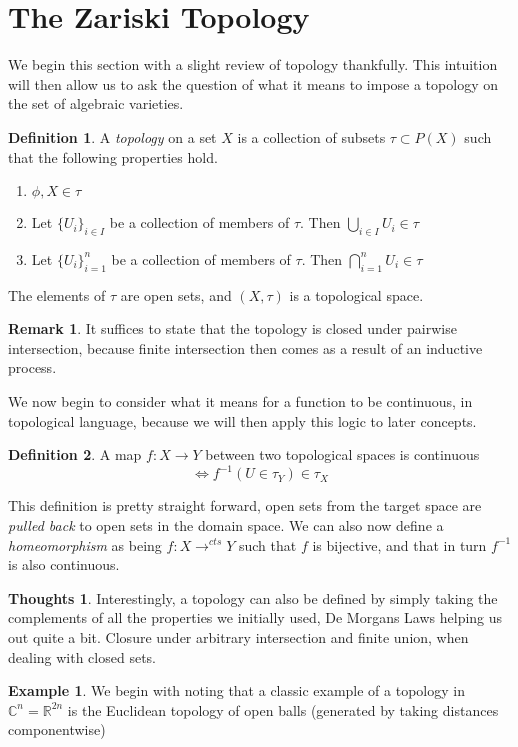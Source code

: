 \documentclass[12pt]{book}
\theoremstyle{definition}
\newtheorem*{definition}{Definition}
\newtheorem{example}{Example}[chapter]
\newtheorem*{huh}{Thoughts}
\newtheorem*{remark}{Remark}
\begin{document}
\section{The Zariski Topology}
We begin this section with a slight review of topology thankfully. This intuition will then allow us to ask the question of what it means to impose a topology on the set of algebraic varieties. 
\begin{definition}
    A \textit{topology} on a set $X$ is a collection of subsets $\tau \subset P(X)$ such that the following properties hold. \begin{enumerate}
        \item $\phi, X \in \tau$
        \item Let $\{U_i\}_{i \in I}$ be a collection of members of $\tau$. Then $\bigcup_{i \in I} U_i \in \tau$
        \item Let $\{U_i\}_{i = 1}^n$ be a collection of members of $\tau$. Then $\bigcap_{i = 1}^n U_i \in \tau$
    \end{enumerate}
    The elements of $\tau$ are open sets, and $(X, \tau)$ is a topological space.
\end{definition}
\begin{remark}
    It suffices to state that the topology is closed under pairwise intersection, because finite intersection then comes as a result of an inductive process.
\end{remark}
We now begin to consider what it means for a function to be continuous, in topological language, because we will then apply this logic to later concepts.
\begin{definition}
    A map $f: X \to Y$ between two topological spaces is continuous $$\iff f^{-1}(U \in \tau_Y) \in \tau_X$$
\end{definition}
This definition is pretty straight forward, open sets from the target space are \textit{pulled back} to open sets in the domain space.
We can also now define a \textit{homeomorphism} as being $f:X \to^{cts} Y$ such that $f$ is bijective, and that in turn $f^{-1}$ is also continuous.
\begin{huh}
    Interestingly, a topology can also be defined by simply taking the complements of all the properties we initially used, De Morgans Laws helping us out quite a bit. Closure under arbitrary intersection and finite union, when dealing with closed sets.
\end{huh}
\begin{example}
    We begin with noting that a classic example of a topology in $\mathbb{C}^n = \mathbb{R}^{2n}$ is the Euclidean topology of open balls (generated by taking distances componentwise)
\end{example}
\end{document}
